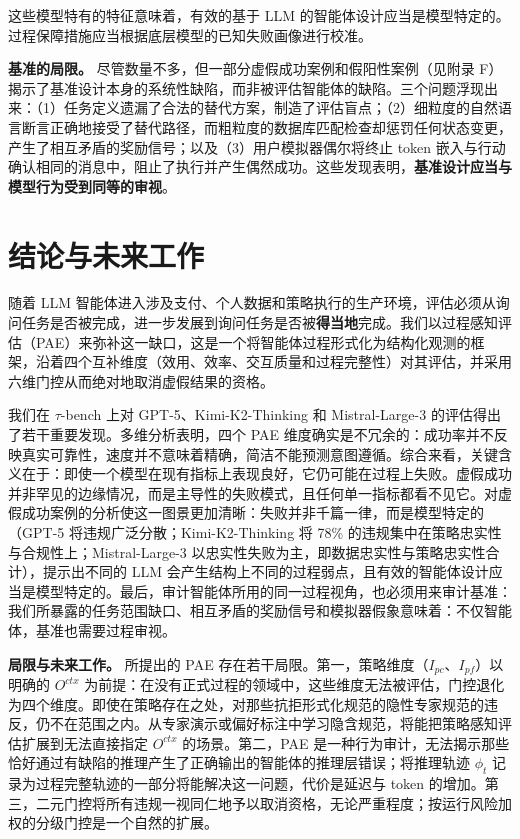 \documentclass[11pt,UTF8,fontset=fandol]{ctexart}
\begin{document}
这些模型特有的特征意味着，有效的基于 LLM 的智能体设计应当是模型特定的。过程保障措施应当根据底层模型的已知失败画像进行校准。

\textbf{基准的局限。} 尽管数量不多，但一部分虚假成功案例和假阳性案例（见附录 F）揭示了基准设计本身的系统性缺陷，而非被评估智能体的缺陷。三个问题浮现出来：（1）任务定义遗漏了合法的替代方案，制造了评估盲点；（2）细粒度的自然语言断言正确地接受了替代路径，而粗粒度的数据库匹配检查却惩罚任何状态变更，产生了相互矛盾的奖励信号；以及（3）用户模拟器偶尔将终止 token 嵌入与行动确认相同的消息中，阻止了执行并产生偶然成功。这些发现表明，\textbf{基准设计应当与模型行为受到同等的审视}。

\section{结论与未来工作}

随着 LLM 智能体进入涉及支付、个人数据和策略执行的生产环境，评估必须从询问任务是否被完成，进一步发展到询问任务是否被\textbf{得当地}完成。我们以过程感知评估（PAE）来弥补这一缺口，这是一个将智能体过程形式化为结构化观测的框架，沿着四个互补维度（效用、效率、交互质量和过程完整性）对其评估，并采用六维门控从而绝对地取消虚假结果的资格。

我们在 $\tau$-bench 上对 GPT-5、Kimi-K2-Thinking 和 Mistral-Large-3 的评估得出了若干重要发现。多维分析表明，四个 PAE 维度确实是不冗余的：成功率并不反映真实可靠性，速度并不意味着精确，简洁不能预测意图遵循。综合来看，关键含义在于：即使一个模型在现有指标上表现良好，它仍可能在过程上失败。虚假成功并非罕见的边缘情况，而是主导性的失败模式，且任何单一指标都看不见它。对虚假成功案例的分析使这一图景更加清晰：失败并非千篇一律，而是模型特定的（GPT-5 将违规广泛分散；Kimi-K2-Thinking 将 78\% 的违规集中在策略忠实性与合规性上；Mistral-Large-3 以忠实性失败为主，即数据忠实性与策略忠实性合计），提示出不同的 LLM 会产生结构上不同的过程弱点，且有效的智能体设计应当是模型特定的。最后，审计智能体所用的同一过程视角，也必须用来审计基准：我们所暴露的任务范围缺口、相互矛盾的奖励信号和模拟器假象意味着：不仅智能体，基准也需要过程审视。

\textbf{局限与未来工作。} 所提出的 PAE 存在若干局限。第一，策略维度（$I_{pc}$、$I_{pf}$）以明确的 $O^{ctx}$ 为前提：在没有正式过程的领域中，这些维度无法被评估，门控退化为四个维度。即使在策略存在之处，对那些抗拒形式化规范的隐性专家规范的违反，仍不在范围之内。从专家演示或偏好标注中学习隐含规范，将能把策略感知评估扩展到无法直接指定 $O^{ctx}$ 的场景。第二，PAE 是一种行为审计，无法揭示那些恰好通过有缺陷的推理产生了正确输出的智能体的推理层错误；将推理轨迹 $\phi_t$ 记录为过程完整轨迹的一部分将能解决这一问题，代价是延迟与 token 的增加。第三，二元门控将所有违规一视同仁地予以取消资格，无论严重程度；按运行风险加权的分级门控是一个自然的扩展。
\end{document}
